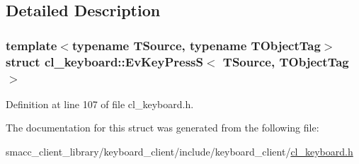\subsection{Detailed Description}
\subsubsection*{template$<$typename T\+Source, typename T\+Object\+Tag$>$\newline
struct cl\+\_\+keyboard\+::\+Ev\+Key\+Press\+S$<$ T\+Source, T\+Object\+Tag $>$}



Definition at line 107 of file cl\+\_\+keyboard.\+h.



The documentation for this struct was generated from the following file\+:\begin{DoxyCompactItemize}
\item 
smacc\+\_\+client\+\_\+library/keyboard\+\_\+client/include/keyboard\+\_\+client/\hyperlink{cl__keyboard_8h}{cl\+\_\+keyboard.\+h}\end{DoxyCompactItemize}
